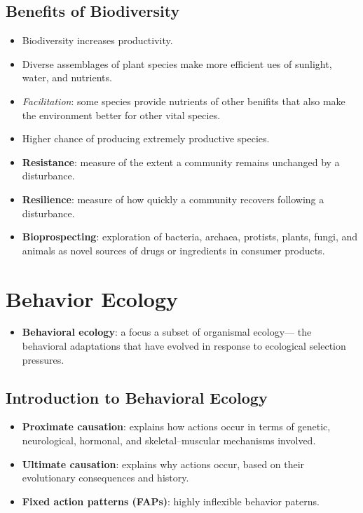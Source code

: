 \documentclass[12pt,a4paper]{article}
\begin{document}
\subsection{Benefits of Biodiversity}
\begin{itemize}
    \item Biodiversity increases productivity. 
    \item Diverse assemblages of plant species make more efficient ues of sunlight, water, and nutrients.
    \item \textit{Facilitation}: some species provide nutrients of other benifits that also make the environment better for other vital species.
    \item Higher chance of producing extremely productive species.
    \item \textbf{Resistance}: measure of the extent a community remains unchanged by a disturbance.
    \item \textbf{Resilience}: measure of how quickly a community recovers following a disturbance. 
    \item \textbf{Bioprospecting}: exploration of bacteria, archaea, protists, plants, fungi, and animals as novel sources of drugs or ingredients in consumer products.
\end{itemize}
\setcounter{section}{49}
\clearpage
\section{Behavior Ecology}
\begin{itemize}
    \item \textbf{Behavioral ecology}: a focus a subset of organismal ecology--- the behavioral adaptations that have evolved in response to ecological selection pressures.
\end{itemize}
\subsection{Introduction to Behavioral Ecology}
\begin{itemize}
    \item \textbf{Proximate causation}: explains how actions occur in terms of genetic, neurological, hormonal, and skeletal--muscular mechanisms involved.
    \item \textbf{Ultimate causation}: explains why actions occur, based on their evolutionary consequences and history.
    \item \textbf{Fixed action patterns (FAPs)}: highly inflexible behavior paterns. 
\end{itemize}
\end{document}
